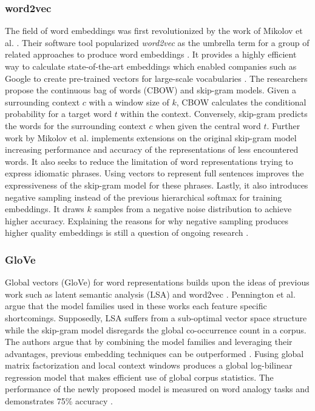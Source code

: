 \subsubsection{word2vec}
The field of word embeddings was first revolutionized by the work of Mikolov et al. \cite{Mikolov2013, Mikolov}.
Their software tool popularized \textit{word2vec} as the umbrella term for a group of related approaches to produce word embeddings  \cite{Method2014}.
It provides a highly efficient way to calculate state-of-the-art embeddings which enabled companies such as Google to create pre-trained vectors for large-scale vocabularies \cite{Young}.
The researchers propose the continuous bag of words (CBOW) and skip-gram models.
Given a surrounding context $c$ with a window size of $k$, CBOW calculates the conditional probability for a target word $t$ within the context.
Conversely, skip-gram predicts the words for the surrounding context $c$ when given the central word $t$.
Further work by Mikolov et al. \cite{Mikolov} implements extensions on the original skip-gram model increasing performance and accuracy of the representations of less encountered words.
It also seeks to reduce the limitation of word representations trying to express idiomatic phrases.
Using vectors to represent full sentences improves the expressiveness of the skip-gram model for these phrases.
Lastly, it also introduces negative sampling instead of the previous hierarchical softmax for training embeddings.
It draws $k$ samples from a negative noise distribution to achieve higher accuracy.
Explaining the reasons for why negative sampling produces higher quality embeddings is still a question of ongoing research \cite{Method2014}.


\subsubsection{GloVe}
Global vectors (GloVe) for word representations builds upon the ideas of previous work such as latent semantic analysis (LSA) \cite{Deerwester1990} and word2vec \cite{Mikolov2013a}.
Pennington et al. \cite{Pennington} argue that the model families used in these works each feature specific shortcomings.
Supposedly, LSA suffers from a sub-optimal vector space structure while the skip-gram model disregards the global co-occurrence count in a corpus.
The authors argue that by combining the model families and leveraging their advantages, previous embedding techniques can be outperformed \cite{Pennington}.
Fusing global matrix factorization and local context windows produces a global log-bilinear regression model that makes efficient use of global corpus statistics.
The performance of the newly proposed model is measured on word analogy tasks and demonstrates 75\% accuracy \cite{Pennington}.


